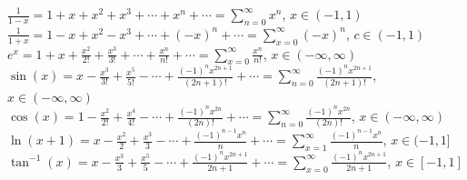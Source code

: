 \documentclass[14pt]{article}
\begin{document}
    $\frac{1}{1-x}=1+x+x^2+x^3+\cdots+x^n+\cdots=\sum\limits_{n=0}^\infty x^n$, $x\in(-1,1)$\\
    $\frac{1}{1+x}=1-x+x^2-x^3+\cdots+(-x)^n+\cdots=\sum\limits_{x=0}^\infty (-x)^n$, $c\in(-1,1)$\\
    $e^x=1+x+\frac{x^2}{2!}+\frac{x^3}{3!}+\cdots+\frac{x^n}{n!}+\cdots=\sum\limits_{x=0}^\infty\frac{x^n}{n!}$, $x\in(-\infty, \infty)$\\
    $\sin(x)=x-\frac{x^3}{3!}+\frac{x^5}{5!}-\cdots+\frac{(-1)^nx^{2n+1}}{(2n+1)!}+\cdots=\sum\limits_{n=0}^\infty \frac{(-1)^nx^{2n+1}}{(2n+1)!}$, $x\in(-\infty, \infty)$\\
    $\cos(x)=1-\frac{x^2}{2!}+\frac{x^4}{4!}-\cdots+\frac{(-1)^nx^{2n}}{(2n)!}+\cdots=\sum\limits_{n=0}^\infty\frac{(-1)^nx^{2n}}{(2n)!}$, $x\in(-\infty, \infty)$\\
    $\ln(x+1)=x-\frac{x^2}{2}+\frac{x^3}{3}-\cdots+\frac{(-1)^{n-1}x^n}{n}+\cdots=\sum\limits_{x=1}^\infty\frac{(-1)^{n-1}x^n}{n}$, $x\in(-1,1]$\\
    $\tan^{-1}(x)=x-\frac{x^3}{3}+\frac{x^5}{5}-\cdots+\frac{(-1)^nx^{2n+1}}{2n+1}+\cdots=\sum\limits_{x=0}^\infty\frac{(-1)^nx^{2n+1}}{2n+1}$, $x\in[-1,1]$\\
\end{document}
